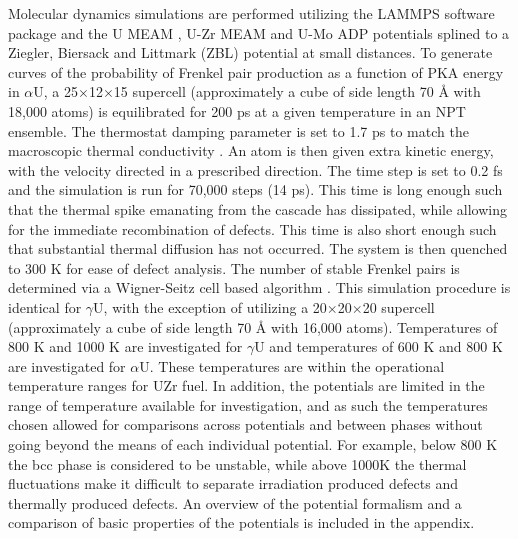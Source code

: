 \documentclass[review]{elsarticle}
\begin{document}
Molecular dynamics simulations are performed utilizing the LAMMPS \cite{plimpton1995} software package and the U MEAM \cite{beeler_meam}, U-Zr MEAM \cite{moore2015} and U-Mo ADP \cite{smirnovaADP} potentials splined to a Ziegler, Biersack and Littmark (ZBL) \cite{zbl} potential at small distances. To generate curves of the probability of Frenkel pair production as a function of PKA energy in $\alpha$U, a 25$\times$12$\times$15 supercell (approximately a cube of side length 70 {\AA} with 18,000 atoms) is equilibrated for 200 ps at a given temperature in an NPT ensemble. The thermostat damping parameter is set to 1.7 ps to match the macroscopic thermal conductivity \cite{lane2012}. An atom is then given extra kinetic energy, with the velocity directed in a prescribed direction. The time step is set to 0.2 fs and the simulation is run for 70,000 steps (14 ps). This time is long enough such that the thermal spike emanating from the cascade has dissipated, while allowing for the immediate recombination of defects. This time is also short enough such that substantial thermal diffusion has not occurred. The system is then quenched to 300 K for ease of defect analysis. The number of stable Frenkel pairs is determined via a Wigner-Seitz cell based algorithm \cite{hayward2010}. This simulation procedure is identical for $\gamma$U, with the exception of utilizing a 20$\times$20$\times$20 supercell (approximately a cube of side length 70 {\AA} with 16,000 atoms). Temperatures of 800 K and 1000 K are investigated for $\gamma$U and temperatures of 600 K and 800 K are investigated for $\alpha$U. These temperatures are within the operational temperature ranges for UZr fuel. In addition, the potentials are limited in the range of temperature available for investigation, and as such the temperatures chosen allowed for comparisons across potentials and between phases without going beyond the means of each individual potential. For example, below 800 K the bcc phase is considered to be unstable, while above 1000K the thermal fluctuations make it difficult to separate irradiation produced defects and thermally produced defects. An overview of the potential formalism and a comparison of basic properties of the potentials is included in the appendix.
\end{document}
